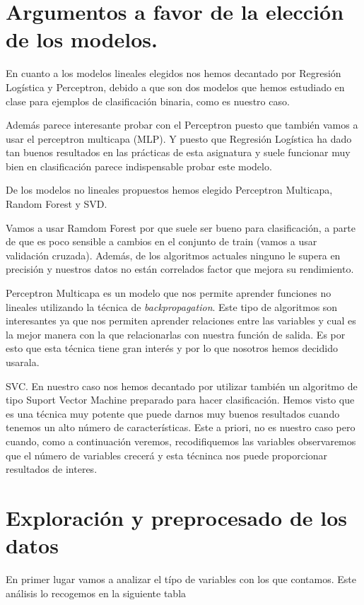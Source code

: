 \documentclass[11pt]{article}
\begin{document}
\section{Argumentos a favor de la elección de los modelos.}

En cuanto a los modelos lineales elegidos nos hemos decantado por Regresión
Logística y Perceptron, debido a que son dos modelos que hemos estudiado en
clase para ejemplos de clasificación binaria, como es nuestro caso.  

Además parece interesante probar con el Perceptron puesto que también vamos a
usar el perceptron multicapa (MLP). Y puesto que Regresión Logística ha dado tan
buenos resultados en las prácticas de esta asignatura y suele funcionar muy bien
en clasificación parece indispensable probar este modelo.

De los modelos no lineales propuestos hemos elegido Perceptron Multicapa, Random
Forest y SVD.

Vamos a usar Ramdom Forest por que suele ser bueno para clasificación, a parte
de que es poco sensible a cambios en el conjunto de train (vamos a usar
validación cruzada). Además, de los algoritmos actuales ninguno le supera en
precisión y nuestros datos no están correlados factor que mejora su
rendimiento.

Perceptron Multicapa es un modelo que nos permite aprender funciones no lineales
utilizando la técnica de \textit{backpropagation}. Este tipo de algoritmos son
interesantes ya que nos permiten aprender relaciones entre las variables y cual
es la mejor manera con la que relacionarlas con nuestra función de salida. Es
por esto que esta técnica tiene gran interés y por lo que nosotros hemos
decidido usarala.

SVC. En nuestro caso nos hemos decantado por utilizar también un algoritmo de tipo
Suport Vector Machine preparado para hacer clasificación. Hemos visto que es una 
técnica muy potente que puede darnos muy buenos resultados cuando tenemos un alto 
número de características. Este a priori, no es nuestro caso pero cuando, como a 
continuación veremos, recodifiquemos las variables observaremos que el número 
de variables crecerá y esta técninca nos puede proporcionar resultados de interes.

\section{Exploración y preprocesado de los datos}

En primer lugar vamos a analizar el típo de variables con los que contamos. Este
análisis lo recogemos en la siguiente tabla
\end{document}
